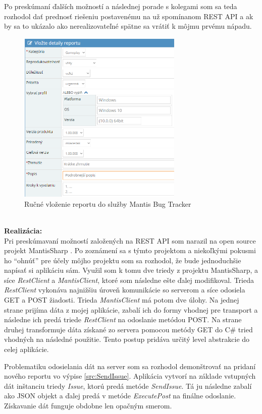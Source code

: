 \documentclass[slovak, bachelorpractice]{diploma}
\begin{document}
Po preskúmaní ďalších možností a následnej porade s kolegami som sa teda rozhodol dať prednosť riešeniu postavenému na už spomínanom REST API a ak by sa to ukázalo ako nerealizovateľné spätne sa vrátiť k môjmu prvému nápadu.
\vspace{-5pt}
\begin{figure}[!htbp]
	\centering
	\includegraphics[width=0.7\textwidth]{Pictures/mantis.png}
	\caption{Ručné vloženie reportu do služby Mantis Bug Tracker}
	\label{pic:Mantis}
\end{figure} \\
\textbf{Realizácia:} \\ Pri preskúmavaní možností založených na REST API som narazil na open source projekt MantisSharp \cite{MantisSharp}. Po zoznámení sa s týmto projektom a niekoľkými pokusmi ho \enquote{ohnúť} pre účely môjho projektu som sa rozhodol, že bude jednoduchšie napísať si aplikáciu sám. Využil som k tomu dve triedy z projektu MantisSharp, a síce \textit{RestClient} a \textit{MantisClient}, ktoré som následne ešte ďalej modifikoval. Trieda \textit{RestClient} vykonáva najnižšiu úroveň komunikácie so serverom a síce odosiela GET a POST žiadosti. Trieda \textit{MantisClient} má potom dve úlohy. Na jednej strane prijíma dáta z mojej aplikácie, zabalí ich do formy vhodnej pre transport a následne ich predá triede \textit{RestClient} na odoslanie metódou POST. Na strane druhej transformuje dáta získané zo servera pomocou metódy GET do C\# tried vhodných na následné použitie. Tento postup pridáva určitý level abstrakcie do celej aplikácie.

Problematiku odosielania dát na server som sa rozhodol demonštrovať na pridaní nového reportu vo výpise \ref{src:SendIssue}. Aplikácia vytvorí na základe vstupných dát inštanciu triedy \textit{Issue}, ktorú predá metóde \textit{SendIssue}. Tá ju následne zabalí ako JSON objekt a ďalej predá v metóde \textit{ExecutePost} na finálne odoslanie. Získavanie dát funguje obdobne len opačným smerom. 
\end{document}
